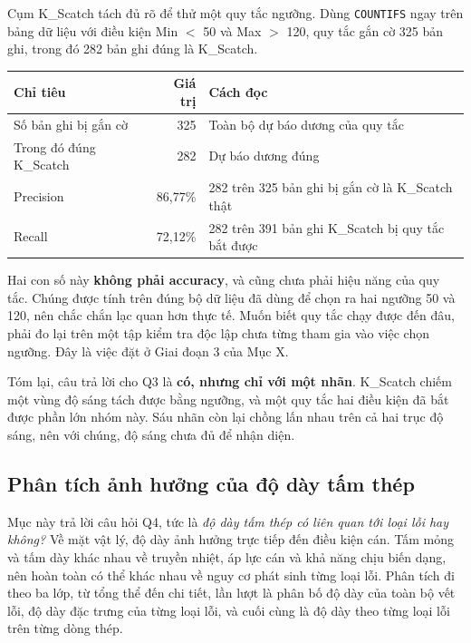 \documentclass[12pt]{article}
\begin{document}
\noindent
Cụm K\_Scatch tách đủ rõ để thử một quy tắc ngưỡng. Dùng \texttt{COUNTIFS} ngay trên bảng dữ liệu với điều kiện Min $<$ 50 và Max $>$ 120, quy tắc gắn cờ 325 bản ghi, trong đó 282 bản ghi đúng là K\_Scatch.

\begin{center}
\small
\begin{tabular}{@{}p{4.6cm} r p{9.0cm}@{}}
\toprule
\textbf{Chỉ tiêu} & \textbf{Giá trị} & \textbf{Cách đọc} \\
\midrule
Số bản ghi bị gắn cờ & 325 & Toàn bộ dự báo dương của quy tắc \\
Trong đó đúng K\_Scatch & 282 & Dự báo dương đúng \\
Precision & 86,77\% & 282 trên 325 bản ghi bị gắn cờ là K\_Scatch thật \\
Recall & 72,12\% & 282 trên 391 bản ghi K\_Scatch bị quy tắc bắt được \\
\bottomrule
\end{tabular}
\end{center}

\noindent
Hai con số này \textbf{không phải accuracy}, và cũng chưa phải hiệu năng của quy tắc. Chúng được tính trên đúng bộ dữ liệu đã dùng để chọn ra hai ngưỡng 50 và 120, nên chắc chắn lạc quan hơn thực tế. Muốn biết quy tắc chạy được đến đâu, phải đo lại trên một tập kiểm tra độc lập chưa từng tham gia vào việc chọn ngưỡng. Đây là việc đặt ở Giai đoạn 3 của Mục X.

\noindent
Tóm lại, câu trả lời cho Q3 là \textbf{có, nhưng chỉ với một nhãn}. K\_Scatch chiếm một vùng độ sáng tách được bằng ngưỡng, và một quy tắc hai điều kiện đã bắt được phần lớn nhóm này. Sáu nhãn còn lại chồng lấn nhau trên cả hai trục độ sáng, nên với chúng, độ sáng chưa đủ để nhận diện.

\subsection{Phân tích ảnh hưởng của độ dày tấm thép}
Mục này trả lời câu hỏi Q4, tức là \emph{độ dày tấm thép có liên quan tới loại lỗi hay không?} Về mặt vật lý, độ dày ảnh hưởng trực tiếp đến điều kiện cán. Tấm mỏng và tấm dày khác nhau về truyền nhiệt, áp lực cán và khả năng chịu biến dạng, nên hoàn toàn có thể khác nhau về nguy cơ phát sinh từng loại lỗi. Phân tích đi theo ba lớp, từ tổng thể đến chi tiết, lần lượt là phân bố độ dày của toàn bộ vết lỗi, độ dày đặc trưng của từng loại lỗi, và cuối cùng là độ dày theo từng loại lỗi trên từng dòng thép.
\end{document}
